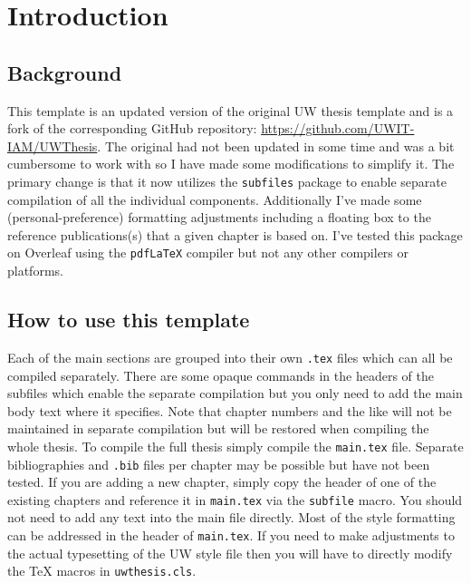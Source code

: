 \documentclass[main.tex]{subfiles}
\begin{document}
\chapter{Introduction}

\section{Background}
This template is an updated version of the original UW thesis template and is a fork of the corresponding GitHub repository: \href{https://github.com/UWIT-IAM/UWThesis}{https://github.com/UWIT-IAM/UWThesis}.
The original had not been updated in some time and was a bit cumbersome to work with so I have made some modifications to simplify it.
The primary change is that it now utilizes the \texttt{subfiles} package to enable separate compilation of all the individual components.
Additionally I've made some (personal-preference) formatting adjustments including a floating box to the reference publications(s) that a given chapter is based on.
I've tested this package on Overleaf using the \texttt{pdfLaTeX} compiler but not any other compilers or platforms.


\section{How to use this template}
Each of the main sections are grouped into their own \texttt{.tex} files which can all be compiled separately.
There are some opaque commands in the headers of the subfiles which enable the separate compilation but you only need to add the main body text where it specifies.
Note that chapter numbers and the like will not be maintained in separate compilation but will be restored when compiling the whole thesis.
To compile the full thesis simply compile the \texttt{main.tex} file.
Separate bibliographies and \texttt{.bib} files per chapter may be possible but have not been tested.
If you are adding a new chapter, simply copy the header of one of the existing chapters and reference it in \texttt{main.tex} via the \texttt{subfile} macro.
You should not need to add any text into the main file directly.
Most of the style formatting can be addressed in the header of \texttt{main.tex}.
If you need to make adjustments to the actual typesetting of the UW style file then you will have to directly modify the TeX macros in \texttt{uwthesis.cls}.
\end{document}
